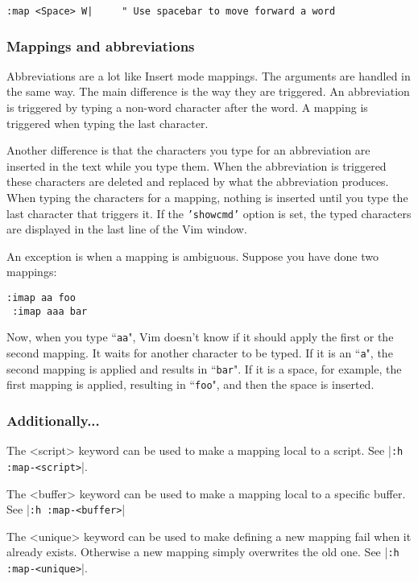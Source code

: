\begin{Verbatim}[samepage=true]
 :map <Space> W|     " Use spacebar to move forward a word
\end{Verbatim}
\subsubsection{Mappings and abbreviations}
Abbreviations are a lot like Insert mode mappings.
The arguments are handled in the same way.
The main difference is the way they are triggered.
An abbreviation is triggered by typing a non-word character after the word.
A mapping is triggered when typing the last character.

Another difference is that the characters you type for an abbreviation are inserted in the text while you type them.
When the abbreviation is triggered these characters are deleted and replaced by what the abbreviation produces.
When typing the characters for a mapping, nothing is inserted until you type the last character that triggers it.
If the \texttt{'showcmd'} option is set, the typed characters are displayed in the last line of the Vim window.

An exception is when a mapping is ambiguous.
Suppose you have done two mappings:

\begin{Verbatim}[samepage=true]
 :imap aa foo
 :imap aaa bar
\end{Verbatim}

Now, when you type ``\texttt{aa}", Vim doesn't know if it should apply the first or the second mapping.
It waits for another character to be typed.
If it is an ``\texttt{a}", the second mapping is applied and results in ``\texttt{bar}".
If it is a space, for example, the first mapping is applied, resulting in ``\texttt{foo}", and then the space is inserted.

\subsubsection{Additionally...}
The <script> keyword can be used to make a mapping local to a script.
See |\texttt{:h :map-<script>}|.

The <buffer> keyword can be used to make a mapping local to a specific buffer.
See |\texttt{:h :map-<buffer>}|

The <unique> keyword can be used to make defining a new mapping fail when it already exists.
Otherwise a new mapping simply overwrites the old one.
See |\texttt{:h :map-<unique>}|.

